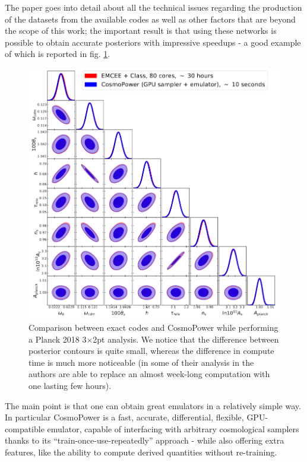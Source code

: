 The paper goes into detail about all the technical issues regarding the production of the datasets from the available codes as well as other factors that are beyond the scope of this work; the important result is that using these networks is possible to obtain accurate posteriors with impressive speedups - a good example of which is reported in fig. \ref{fig:cosmopower_contours}.
\begin{figure}[h]
    \centering
    \includegraphics[width=1.0\textwidth]{img/cosmopower_contours.png}
    \caption{Comparison between exact codes and CosmoPower while performing a Planck 2018 3$\times$2pt analysis. We notice that the difference between posterior contours is quite small, whereas the difference in compute time is much more noticeable (in some of their analysis in \cite{cosmopower} the authors are able to replace an almost week-long computation with one lasting few hours).}
    \label{fig:cosmopower_contours}
\end{figure}
The main point is that one can obtain great emulators in a relatively simple way. In particular CosmoPower is a fast, accurate, differential, flexible, GPU-compatible emulator, capable of interfacing with arbitrary cosmological samplers thanks to its ``train-once-use-repeatedly'' approach - while also offering extra features, like the ability to compute derived quantities without re-training.

